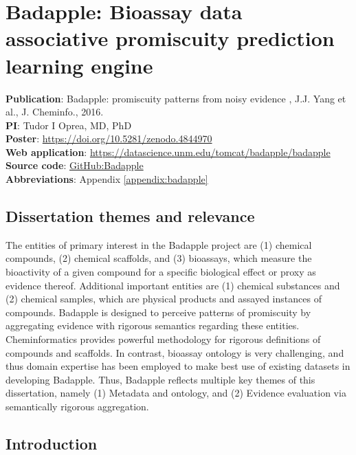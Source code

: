 \chapter{Badapple: Bioassay data associative promiscuity prediction learning engine}

\textbf{Publication}: Badapple: promiscuity patterns from noisy evidence , J.J. Yang et al., J. Cheminfo., 2016\cite{Yang2016-gn}.\\
\textbf{PI}: Tudor I Oprea, MD, PhD\\
\textbf{Poster}: \href{https://doi.org/10.5281/zenodo.4844970}{https://doi.org/10.5281/zenodo.4844970}\\
\textbf{Web application}: \href{https://datascience.unm.edu/tomcat/badapple/badapple}{https://datascience.unm.edu/tomcat/badapple/badapple}\\
\textbf{Source code}: \href{https://github.com/unmtransinfo/Badapple}{GitHub:Badapple}\\
\textbf{Abbreviations}: Appendix \ref{appendix:badapple}

\section{Dissertation themes and relevance}

The entities of primary interest in the Badapple project are (1) chemical 
compounds, (2) chemical scaffolds, and (3) bioassays, which measure 
the bioactivity of a given compound for a specific biological effect or
proxy as evidence thereof. Additional important entities are (1) chemical 
substances and (2) chemical samples, which are physical products and 
assayed instances of compounds. Badapple is designed to perceive patterns
of promiscuity by aggregating evidence with rigorous semantics regarding these entities. Cheminformatics provides powerful methodology for rigorous definitions of compounds and scaffolds. In contrast, bioassay ontology is very challenging, and thus domain expertise has been employed to make best use of existing datasets in developing Badapple. Thus, Badapple reflects multiple key themes of this dissertation, namely (1) Metadata and ontology, and (2) Evidence evaluation via semantically rigorous aggregation.

\section{Introduction}

